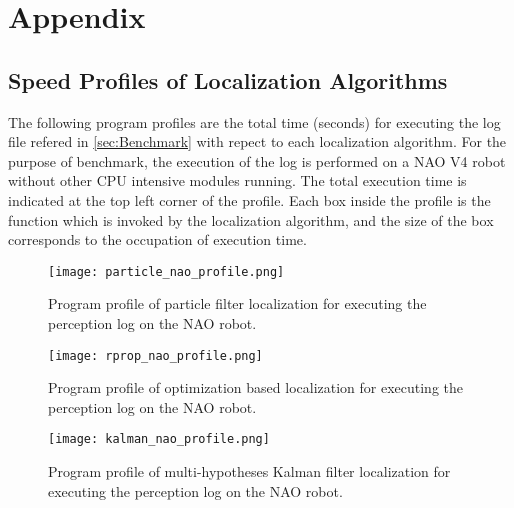 \chapter{Appendix}\label{testdat}

\section{Speed Profiles of Localization Algorithms}\label{sec:profiles}
The following program profiles are the total time (seconds) for executing the log file refered in \autoref{sec:Benchmark} with repect to each localization algorithm. For the purpose of benchmark, the execution of the log is performed on a NAO V4 robot without other CPU intensive modules running. The total execution time is indicated at the top left corner of the profile. Each box inside the profile is the function which is invoked by the localization algorithm, and the size of the box corresponds to the occupation of execution time. 

\begin{figure}[h!]
  \texttt{[image: particle\_nao\_profile.png]}
  \caption{Program profile of particle filter localization for executing the perception log on the NAO robot.}
  \label{fig:profile_partcile}
\end{figure}

\begin{figure}[h!]
  \texttt{[image: rprop\_nao\_profile.png]}
  \caption{Program profile of optimization based localization for executing the perception log on the NAO robot.}
  \label{fig:profile_rprop}
\end{figure}

\begin{figure}[h!]
  \texttt{[image: kalman\_nao\_profile.png]}
  \caption{Program profile of multi-hypotheses Kalman filter localization for executing the perception log on the NAO robot.}
  \label{fig:profile_kalman}
\end{figure}


